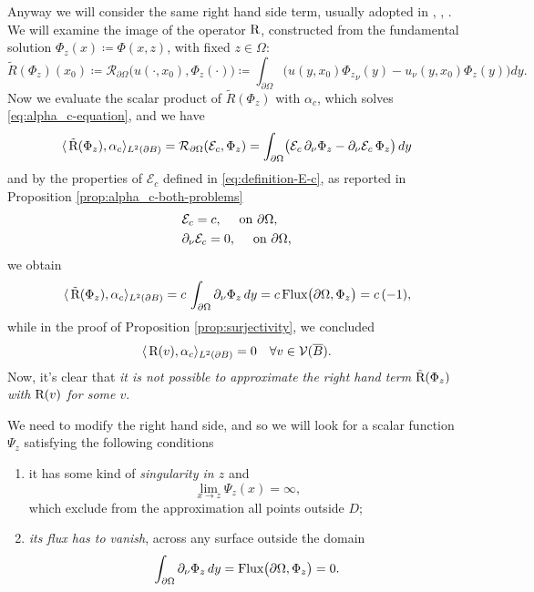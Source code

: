 \documentclass[10pt, a4paper, twoside, openright]{book}
\theoremstyle{definition}
\theoremstyle{plain}
\theoremstyle{plain}
\theoremstyle{plain}
\theoremstyle{plain}
\theoremstyle{plain}
\theoremstyle{plain}
\theoremstyle{plain}
\theoremstyle{plain}
\begin{document}
Anyway we will consider the same right hand side term, usually adopted in \cite{colton-haddar:rg}, \cite{dicristo-sun:2006}, \cite{dicristo-sun:2007}.
We will examine the image of the operator $\textup{R}$, constructed from the fundamental solution $\Phi_z(x)\coloneqq\Phi(x,z)$, with fixed $z\in\Omega$:
\begin{equation}
 \tilde{R}(\Phi_z)(x_0) \coloneqq \mathcal{R}_{\partial\Omega}\bigl(u(\cdot,x_0),\Phi_z(\cdot)\bigr)\coloneqq \int_{\partial \Omega}\bigl(u(y,x_0){\Phi_z}_\nu (y) - u_\nu(y,x_0)\Phi_z(y)\bigr)dy.
\end{equation}
Now we evaluate the scalar product of $\tilde{R}(\Phi_z)$ with $\alpha_{c}$, which solves \eqref{eq:alpha_c-equation}, and we have
\begin{equation}
 \langle \, \tilde{\textup{R}}(\Phi_z) ,\alpha_{c}\rangle_{L^2(\partial B)}=\mathcal{R}_{\partial \Omega}(\mathcal{E}_{c}, \Phi_z)=\int_{\partial\Omega}\bigl(\mathcal{E}_{c}\,\partial_\nu \Phi_z - \partial_\nu\mathcal{E}_{c}\, \Phi_z\bigr)\,dy
\end{equation}
and by the properties of $\mathcal{E}_{c}$ defined in \eqref{eq:definition-E-c}, as reported in Proposition \ref{prop:alpha_c-both-problems}
\begin{align}
 &\mathcal{E}_{c}=c, \quad\textup{ on }\partial\Omega,\\
 &\partial_\nu\mathcal{E}_{c}=0,\quad \textup{ on }\partial\Omega,
\end{align}
we obtain
\begin{equation}
 \langle \, \tilde{\textup{R}}(\Phi_z) ,\alpha_{c}\rangle_{L^2(\partial B)} = c\,\int_{\partial\Omega}\partial_\nu\Phi_z\,dy = c\,\textup{Flux}\bigl(\partial\Omega, \Phi_z\bigr) = c\,(-1),
\end{equation}
while in the proof of Proposition \ref{prop:surjectivity}, we concluded 
\begin{equation}
 \langle \, \textup{R}(v) ,\alpha_{c}\rangle_{L^2(\partial B)}=0\quad \forall v\in\mathcal{V}(\overline{B}).
\end{equation}
Now, it's clear that \emph{it is not possible to approximate the right hand term $\tilde{\textup{R}}(\Phi_z)$ with $\textup{R}(v)$ for some $v$}.
\par
We need to modify the right hand side, and so we will look for a scalar function $\Psi_z$ satisfying the following conditions
\begin{enumerate}
 \item it has some kind of \emph{singularity in $z$} and 
 \begin{equation}
  \lim_{x\to z}\Psi_z(x) = \infty,\label{eq:condition-singularity}
 \end{equation}
  which exclude from the approximation all points outside $D$;
 \item \emph{its flux has to vanish}, across any surface outside the domain
 \begin{equation}
  \int_{\partial\Omega}\partial_\nu\Phi_z\,dy = \textup{Flux}\bigl(\partial\Omega, \Phi_z\bigr) = 0.\label{eq:condition-flux}
 \end{equation}
\end{enumerate}
\end{document}
